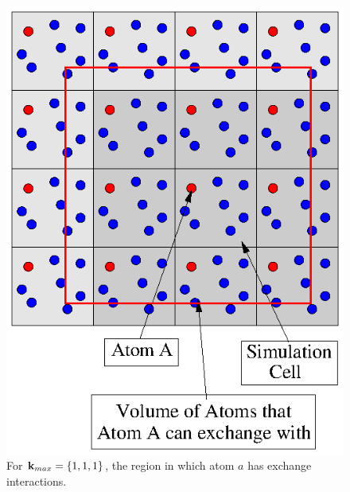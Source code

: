 \documentclass[prb,aps,nobibnotes,twocolumn,doublespace,twocolumngrid,superbib]{revtex4}
\begin{document}
\begin{figure}
\caption{For ${\bf k}_{max}=\{1,1,1\}$, the region in which atom $a$ has exchange interactions.}
\label{figure:ExchangeRegion_k111}
{\centering \includegraphics{ExchangeRegion_k111.ps} \par}
\end{figure}
%
%
%
\end{document}
